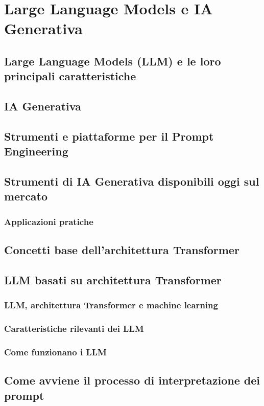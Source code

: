 \section{Large Language Models e IA Generativa}
    \subsection{Large Language Models (LLM) e le loro principali caratteristiche}
    \subsection{IA Generativa}
    \subsection{Strumenti e piattaforme per il Prompt Engineering}
    \subsection{Strumenti di IA Generativa disponibili oggi sul mercato}
        \subsubsection{Applicazioni pratiche}
    \subsection{Concetti base dell’architettura Transformer}
    \subsection{LLM basati su architettura Transformer}
        \subsubsection{LLM, architettura Transformer e machine learning}
        \subsubsection{Caratteristiche rilevanti dei LLM}
        \subsubsection{Come funzionano i LLM}
    \subsection{Come avviene il processo di interpretazione dei prompt}
